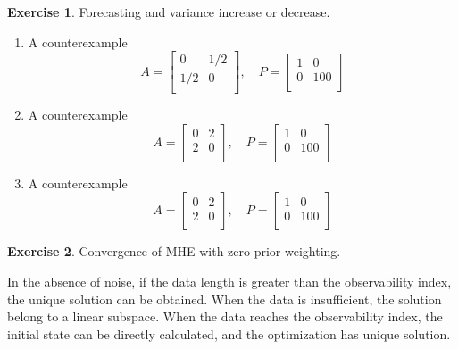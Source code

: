 \documentclass[11pt,a4paper]{report}
\theoremstyle{definition}\newtheorem{exercise}{Exercise}[chapter]
\begin{document}
\begin{exercise}Forecasting and variance increase or decrease.\\
\end{exercise}
\begin{answer}
\begin{enumerate}[label=(\alph*)]
    \item A counterexample
    \begin{equation}
        A=
        \begin{bmatrix}
        0 & 1/2 \\
        1/2 & 0 \\
        \end{bmatrix},\quad
        P=
        \begin{bmatrix}
        1 & 0 \\
        0 & 100 \\
        \end{bmatrix}
    \end{equation}
    \item A counterexample
    \begin{equation}
        A=
        \begin{bmatrix}
        0 & 2 \\
        2 & 0 \\
        \end{bmatrix},\quad
        P=
        \begin{bmatrix}
        1 & 0 \\
        0 & 100 \\
        \end{bmatrix}
    \end{equation}
    \item A counterexample
    \begin{equation}
        A=
        \begin{bmatrix}
        0 & 2 \\
        2 & 0 \\
        \end{bmatrix},\quad
        P=
        \begin{bmatrix}
        1 & 0 \\
        0 & 100 \\
        \end{bmatrix}
    \end{equation}
\end{enumerate}
\end{answer}


\begin{exercise}Convergence of MHE with zero prior weighting.\\
\end{exercise}
\begin{answer}
In the absence of noise, if the data length is greater than the observability index, the unique solution can be obtained. When the data is insufficient, the solution belong to a linear subspace. When the data reaches the observability index, the initial state can be directly calculated, and the optimization has unique solution.
\end{answer}
\end{document}
